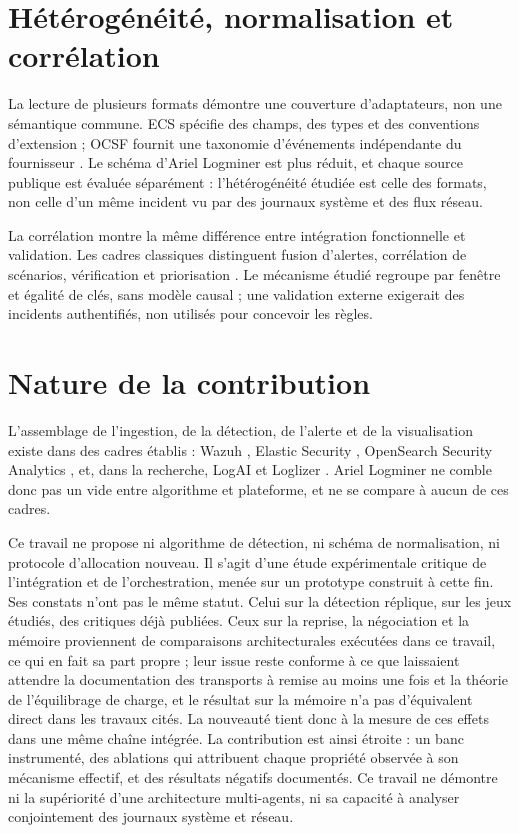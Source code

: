 \section{Hétérogénéité, normalisation et corrélation}

La lecture de plusieurs formats démontre une couverture d'adaptateurs, non une sémantique
commune. ECS spécifie des champs, des types et des conventions d'extension
\cite{elastic2026ecs} ; OCSF fournit une taxonomie d'événements indépendante du fournisseur
\cite{ocsf2026schema}. Le schéma d'Ariel Logminer est plus réduit, et chaque source publique
est évaluée séparément : l'hétérogénéité étudiée est celle des formats, non celle d'un même
incident vu par des journaux système et des flux réseau.

La corrélation montre la même différence entre intégration fonctionnelle et validation. Les
cadres classiques distinguent fusion d'alertes, corrélation de scénarios, vérification et
priorisation \cite{cuppens2002alert,valeur2004correlation}. Le mécanisme étudié regroupe par
fenêtre et égalité de clés, sans modèle causal ; une validation externe exigerait des
incidents authentifiés, non utilisés pour concevoir les règles.

\section{Nature de la contribution}
\label{sec:nature-contribution}

L'assemblage de l'ingestion, de la détection, de l'alerte et de la visualisation existe dans
des cadres établis : Wazuh \cite{wazuh2026architecture}, Elastic Security
\cite{elastic2026ecs,elastic2026security}, OpenSearch Security Analytics
\cite{opensearch2026securityanalytics}, et, dans la recherche, LogAI et Loglizer
\cite{cheng2023logai,he2016experience,logpai2026loglizer}. Ariel Logminer ne comble donc
pas un vide entre algorithme et plateforme, et ne se compare à aucun de ces cadres.

Ce travail ne propose ni algorithme de détection, ni schéma de normalisation, ni protocole
d'allocation nouveau. Il s'agit d'une étude expérimentale critique de l'intégration et de
l'orchestration, menée sur un prototype construit à cette fin. Ses constats n'ont pas le même
statut. Celui sur la détection réplique, sur les jeux étudiés, des critiques déjà publiées.
Ceux sur la reprise, la négociation et la mémoire proviennent de comparaisons
architecturales exécutées dans ce travail, ce qui en fait sa part propre ; leur issue reste
conforme à ce que laissaient attendre la documentation des transports à remise au moins une
fois et la théorie de l'équilibrage de charge, et le résultat sur la mémoire n'a pas
d'équivalent direct dans les travaux cités. La nouveauté tient donc à la mesure de ces effets
dans une même chaîne intégrée. La contribution est ainsi étroite : un banc instrumenté, des
ablations qui attribuent chaque propriété observée à son mécanisme effectif, et des résultats
négatifs documentés. Ce travail ne démontre ni la supériorité d'une architecture
multi-agents, ni sa capacité à analyser conjointement des journaux système et réseau.
